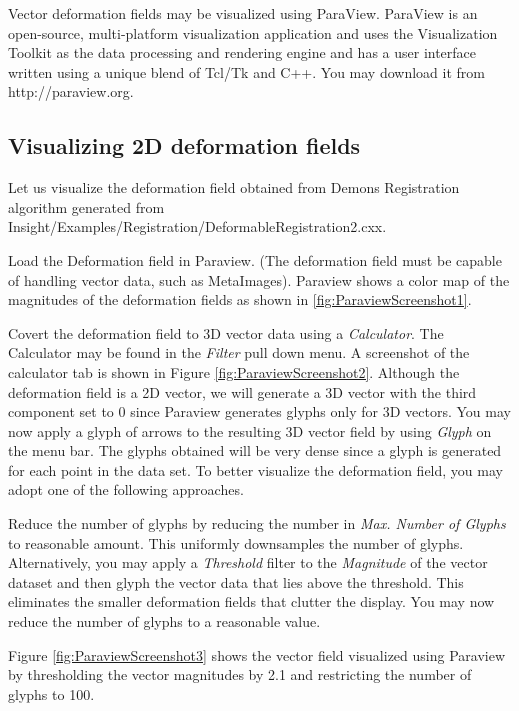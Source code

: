 %
%
%
%
%
%
Vector deformation fields may be visualized using ParaView.
ParaView \cite{ParaviewBook} is an open-source, multi-platform visualization application and uses the Visualization Toolkit as the data processing and rendering engine and has a user interface written using a unique blend of Tcl/Tk and C++. You may download it from http://paraview.org.

\subsection{Visualizing 2D deformation fields}
Let us visualize the deformation field obtained from Demons Registration algorithm generated from Insight/Examples/Registration/DeformableRegistration2.cxx.

Load the Deformation field in Paraview. (The deformation field must be capable of handling vector data, such as MetaImages). Paraview shows a color map of the magnitudes of the deformation fields as shown in \ref{fig:ParaviewScreenshot1}.

Covert the deformation field to 3D vector data using a {\it Calculator}. The Calculator may be found in the {\it Filter} pull down menu. A screenshot of the calculator tab is shown in Figure \ref{fig:ParaviewScreenshot2}. Although the deformation field is a 2D vector, we will generate a 3D vector with the third component set to 0 since Paraview generates glyphs only for 3D vectors. You may now apply a glyph of arrows to the resulting 3D vector field by using {\it Glyph} on the menu bar. The glyphs obtained will be very dense since a glyph is generated for each point in the data set. To better visualize the deformation field, you may adopt one of the following approaches. 

Reduce the number of glyphs by reducing the number in {\it Max. Number of Glyphs} to reasonable amount. This uniformly downsamples the number of glyphs. Alternatively, you may apply a {\it Threshold} filter to the {\it Magnitude} of the vector dataset and then glyph the vector data that lies above the threshold. This eliminates the smaller deformation fields that clutter the display. You may now reduce the number of glyphs to a reasonable value.

Figure \ref{fig:ParaviewScreenshot3} shows the vector field visualized using Paraview by thresholding the vector magnitudes by 2.1 and restricting the number of glyphs to 100.

